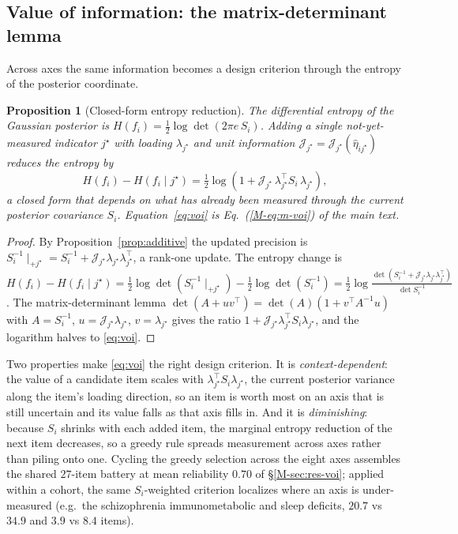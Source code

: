 \documentclass[11pt]{article}
\newcommand{\unitinfo}{\mathcal{J}}
\theoremstyle{plain}
\newtheorem{proposition}{Proposition}
\theoremstyle{definition}
\newcommand{\MEq}[1]{Eq.~(\ref{M-#1})}
\newcommand{\MSec}[1]{\S\ref{M-#1}}
\begin{document}
\subsection{Value of information: the matrix-determinant lemma}
\label{sub:voi}

Across axes the same information becomes a design criterion through the entropy of the
posterior coordinate.

\begin{proposition}[Closed-form entropy reduction]\label{prop:voi}
The differential entropy of the Gaussian posterior is
$H(f_i)=\tfrac12\log\det(2\pi e\,S_i)$. Adding a single not-yet-measured indicator
$j^\star$ with loading $\lambda_{j^\star}$ and unit information
$\unitinfo_{j^\star}=\unitinfo_{j^\star}(\hat\eta_{ij^\star})$ reduces the entropy by
\begin{equation}
  H(f_i)-H(f_i\mid j^\star)
  =\tfrac12\log\!\left(1+\unitinfo_{j^\star}\,\lambda_{j^\star}^{\top} S_i\,\lambda_{j^\star}\right),
  \label{eq:voi}
\end{equation}
a closed form that depends on what has already been measured through the current posterior
covariance $S_i$. Equation~\eqref{eq:voi} is \MEq{eq:m-voi} of the main text.
\end{proposition}
\begin{proof}
By Proposition~\ref{prop:additive} the updated precision is
$S_i^{-1}\!\mid_{+j^\star}=S_i^{-1}+\unitinfo_{j^\star}\lambda_{j^\star}\lambda_{j^\star}^{\top}$,
a rank-one update. The entropy change is
$H(f_i)-H(f_i\mid j^\star)=\tfrac12\log\det(S_i^{-1}\!\mid_{+j^\star})-\tfrac12\log\det(S_i^{-1})
=\tfrac12\log\frac{\det(S_i^{-1}+\unitinfo_{j^\star}\lambda_{j^\star}\lambda_{j^\star}^{\top})}{\det S_i^{-1}}$.
The matrix-determinant lemma $\det(A+uv^\top)=\det(A)(1+v^\top A^{-1}u)$ with $A=S_i^{-1}$,
$u=\unitinfo_{j^\star}\lambda_{j^\star}$, $v=\lambda_{j^\star}$ gives the ratio
$1+\unitinfo_{j^\star}\lambda_{j^\star}^{\top}S_i\lambda_{j^\star}$, and the logarithm halves
to \eqref{eq:voi}.
\end{proof}
\noindent
Two properties make \eqref{eq:voi} the right design criterion. It is \emph{context-dependent}:
the value of a candidate item scales with $\lambda_{j^\star}^{\top}S_i\lambda_{j^\star}$, the
current posterior variance along the item's loading direction, so an item is worth most on an
axis that is still uncertain and its value falls as that axis fills in. And it is
\emph{diminishing}: because $S_i$ shrinks with each added item, the marginal entropy reduction
of the next item decreases, so a greedy rule spreads measurement across axes rather than
piling onto one. Cycling the greedy selection across the eight axes assembles the shared
$27$-item battery at mean reliability $0.70$ of \MSec{sec:res-voi}; applied within a cohort,
the same $S_i$-weighted criterion localizes where an axis is under-measured (e.g.\ the
schizophrenia immunometabolic and sleep deficits, $20.7$ vs $34.9$ and $3.9$ vs $8.4$ items).
\end{document}
